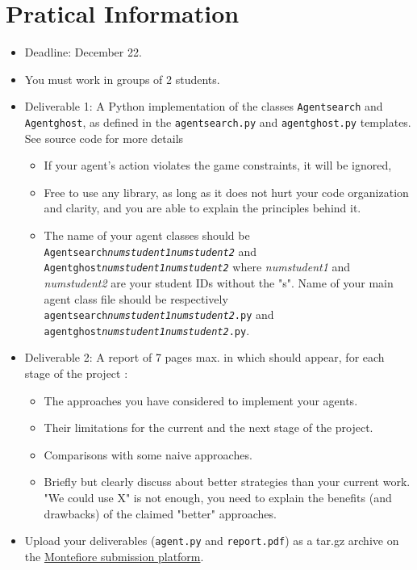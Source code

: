 \documentclass[12pt,a4paper,BCOR12mm, headexclude, footexclude, twoside, openright]{scrartcl}
\newcommand*{\TakeFourierOrnament}[1]{{%
\fontencoding{U}\fontfamily{futs}\selectfont\char#1}}
\newcommand*{\danger}{\TakeFourierOrnament{66}}
\numberwithin{equation}{section} %
\numberwithin{figure}{section} %
\numberwithin{table}{section} %
\begin{document}
\section{Pratical Information}
\begin{itemize}
	
    \item Deadline: December 22.
    \item You must work in groups of 2 students.
    \item Deliverable 1: A Python implementation of the classes \texttt{Agentsearch} and \texttt{Agentghost}, as defined in the  \texttt{agentsearch.py} and \texttt{agentghost.py} templates. See source code for more details
    \begin{itemize}
    	\item \danger If your agent's action violates the game constraints, it will be ignored,
        \item Free to use any library, as long as it does not hurt your code organization and clarity, and you are able to explain the principles behind it.
        \item The name of your agent classes should be \texttt{Agentsearch\emph{numstudent1}\emph{numstudent2}} and \texttt{Agentghost\emph{numstudent1}\emph{numstudent2}} where \emph{numstudent1} and \emph{numstudent2} are your student IDs without the "s". Name of your main agent class file should be respectively \texttt{agentsearch\emph{numstudent1}\emph{numstudent2}.py} and \texttt{agentghost\emph{numstudent1}\emph{numstudent2}.py}. 
        
    \end{itemize}
    \item Deliverable 2: A report of 7 pages max. in which should appear, for each stage of the project :
    	\begin{itemize}
        	\item The approaches you have considered to implement your agents.
            \item Their limitations for the current and the next stage of the project.
            \item Comparisons with some naive approaches.
            \item Briefly but clearly discuss about better strategies than your current work. "We could use X" is not enough, you need to explain the benefits (and drawbacks) of the claimed "better" approaches.
        \end{itemize}
    \item Upload your deliverables (\texttt{agent.py} and \texttt{report.pdf}) as a tar.gz archive on the \href{http://submit.montefiore.ulg.ac.be/student/viewprojects/INFO8006}{Montefiore submission platform}.


\end{itemize}
\end{document}
